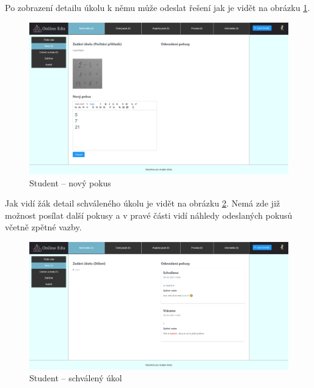 \documentclass[twoside]{ctuthesis}
\theoremstyle{plain}
\theoremstyle{definition}
\theoremstyle{note}
\begin{document}
Po zobrazení detailu úkolu k němu může odeslat řešení jak je vidět na obrázku \ref{ref:student-novy-pokus}.
\begin{figure}[H]
    \caption{Student -- nový pokus}
    \label{ref:student-novy-pokus}
    \centering
    \includegraphics[width=\textwidth]{images/app_screenshots/zak_novy_pokus}
\end{figure}

Jak vidí žák detail schváleného úkolu je vidět na obrázku \ref{ref:student-schvaleny-ukol}. Nemá zde již možnost posílat další pokusy a v pravé části vidí náhledy odeslaných pokusů včetně zpětné vazby.
\begin{figure}[H]
    \caption{Student -- schválený úkol}
    \label{ref:student-schvaleny-ukol}
    \centering
    \includegraphics[width=\textwidth]{images/app_screenshots/zak_schvaleny_ukol}
\end{figure}
\end{document}
